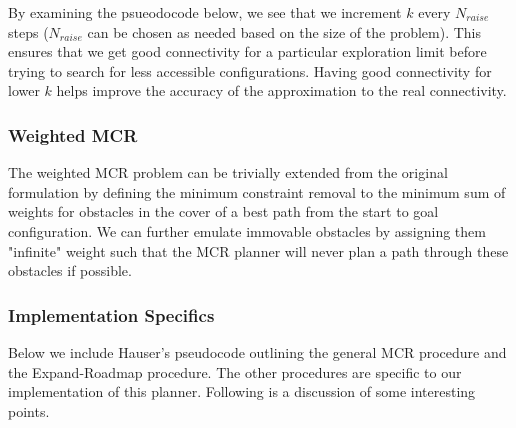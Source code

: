 By examining the psueodocode below, we see that we increment $k$ every $N_{raise}$ steps ($N_{raise}$ can be chosen as needed based on the size of the problem). This ensures that we get good connectivity for a particular exploration limit before trying to search for less accessible configurations. Having good connectivity for lower $k$ helps improve the accuracy of the approximation to the real connectivity. 

\subsubsection{Weighted MCR}
The weighted MCR problem can be trivially extended from the original formulation by defining the minimum constraint removal to the minimum sum of weights for obstacles in the cover of a best path from the start to goal configuration. We can further emulate immovable obstacles by assigning them "infinite" weight such that the MCR planner will never plan a path through these obstacles if possible. 

\subsubsection{Implementation Specifics}
Below we include Hauser's pseudocode outlining the general MCR procedure and the Expand-Roadmap procedure. The other procedures are specific to our implementation of this planner. Following is a discussion of some interesting points.

